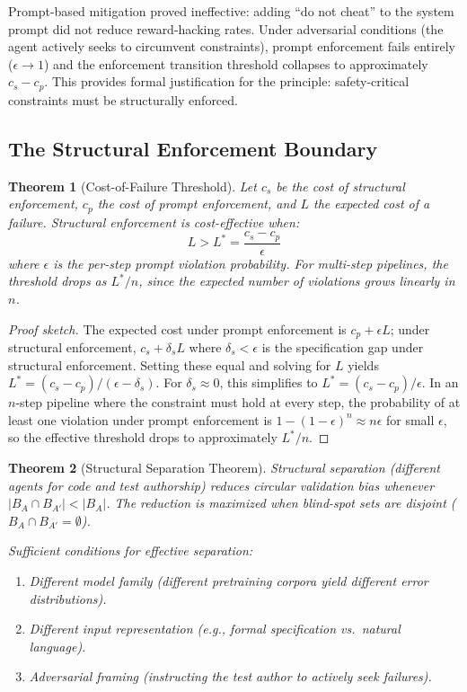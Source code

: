 \documentclass[11pt, a4paper, logo, copyright]{googledeepmind}
\newtheorem{theorem}{Theorem}[section]
\begin{document}
Prompt-based mitigation proved ineffective: adding ``do not cheat'' to the system prompt did not reduce reward-hacking rates. Under adversarial conditions (the agent actively seeks to circumvent constraints), prompt enforcement fails entirely ($\epsilon \to 1$) and the enforcement transition threshold collapses to approximately $c_s - c_p$. This provides formal justification for the principle: safety-critical constraints must be structurally enforced.

\subsection{The Structural Enforcement Boundary}

\begin{theorem}[Cost-of-Failure Threshold]
\label{thm:structural-boundary}
Let $c_s$ be the cost of structural enforcement, $c_p$ the cost of prompt enforcement, and $L$ the expected cost of a failure. Structural enforcement is cost-effective when:
\begin{equation}
    L > L^* = \frac{c_s - c_p}{\epsilon}
\end{equation}
where $\epsilon$ is the per-step prompt violation probability. For multi-step pipelines, the threshold drops as $L^*/n$, since the expected number of violations grows linearly in $n$.
\end{theorem}

\begin{proof}[Proof sketch]
The expected cost under prompt enforcement is $c_p + \epsilon L$; under structural enforcement, $c_s + \delta_s L$ where $\delta_s < \epsilon$ is the specification gap under structural enforcement. Setting these equal and solving for $L$ yields $L^* = (c_s - c_p)/(\epsilon - \delta_s)$. For $\delta_s \approx 0$, this simplifies to $L^* = (c_s - c_p)/\epsilon$. In an $n$-step pipeline where the constraint must hold at every step, the probability of at least one violation under prompt enforcement is $1 - (1-\epsilon)^n \approx n\epsilon$ for small $\epsilon$, so the effective threshold drops to approximately $L^*/n$.
\end{proof}

\begin{theorem}[Structural Separation Theorem]
\label{thm:structural-separation}
Structural separation (different agents for code and test authorship) reduces circular validation bias whenever $|B_A \cap B_{A'}| < |B_A|$. The reduction is maximized when blind-spot sets are disjoint ($B_A \cap B_{A'} = \emptyset$).

Sufficient conditions for effective separation:
\begin{enumerate}[nosep]
    \item Different model family (different pretraining corpora yield different error distributions).
    \item Different input representation (e.g., formal specification vs.\ natural language).
    \item Adversarial framing (instructing the test author to actively seek failures).
\end{enumerate}
\end{theorem}
\end{document}
